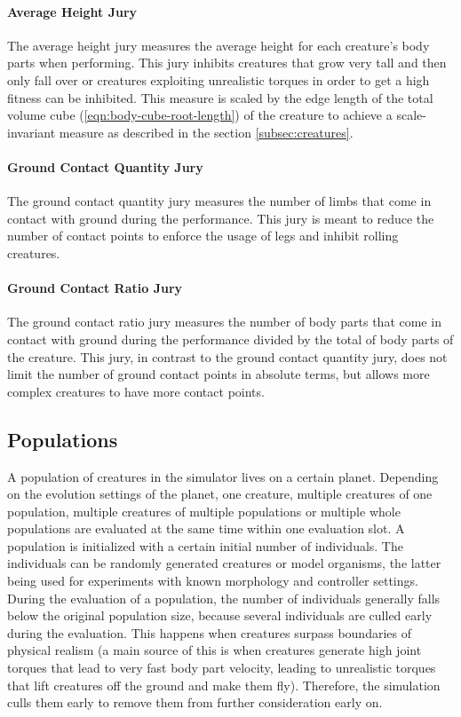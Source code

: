 \documentclass[main]{subfiles}
\begin{document}
\paragraph{Average Height Jury} The average height jury measures the average height for each creature's body parts when performing. %
%
This jury inhibits creatures that grow very tall and then only fall over or creatures exploiting unrealistic torques in order to get a high fitness can be inhibited. %
%
This measure is scaled by the edge length of the total volume cube (\eqref{eqn:body-cube-root-length}) of the creature to achieve a scale-invariant measure as described in the section \ref{subsec:creatures}.

\paragraph{Ground Contact Quantity Jury} The ground contact quantity jury measures the number of limbs that come in contact with ground during the performance. %
%
This jury is meant to reduce the number of contact points to enforce the usage of legs and inhibit rolling creatures.

\paragraph{Ground Contact Ratio Jury} The ground contact ratio jury measures the number of body parts that come in contact with ground during the performance divided by the total of body parts of the creature. %
%
This jury, in contrast to the ground contact quantity jury, does not limit the number of ground contact points in absolute terms, but allows more complex creatures to have more contact points.

\subsection{Populations}
\label{subsec:populations}

A population of creatures in the simulator lives on a certain planet. %
%
Depending on the evolution settings of the planet, one creature, multiple creatures of one population, multiple creatures of multiple populations or multiple whole populations are evaluated at the same time within one evaluation slot. %
%
A population is initialized with a certain initial number of individuals. %
%
The individuals can be randomly generated creatures or model organisms, the latter being used for experiments with known morphology and controller settings. %
%
During the evaluation of a population, the number of individuals generally falls below the original population size, because several individuals are culled early during the evaluation. %
%
This happens when creatures surpass boundaries of physical realism (a main source of this is when creatures generate high joint torques that lead to very fast body part velocity, leading to unrealistic torques that lift creatures off the ground and make them fly). %
%
Therefore, the simulation culls them early to remove them from further consideration early on.
\end{document}
